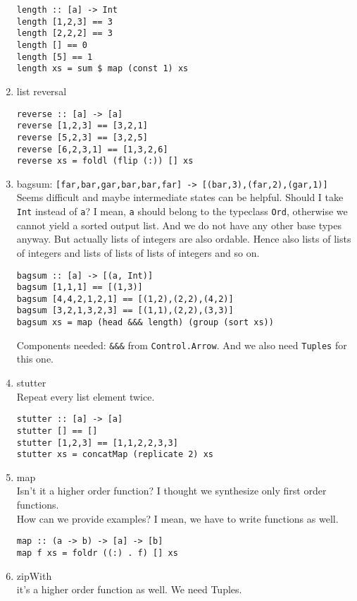 \begin{enumerate}
\begin{lstlisting}
length :: [a] -> Int
length [1,2,3] == 3
length [2,2,2] == 3
length [] == 0
length [5] == 1
length xs = sum $ map (const 1) xs
	\end{lstlisting}
%
	\item list reversal
	\begin{lstlisting}
reverse :: [a] -> [a]
reverse [1,2,3] == [3,2,1]
reverse [5,2,3] == [3,2,5]
reverse [6,2,3,1] == [1,3,2,6]
reverse xs = foldl (flip (:)) [] xs
	\end{lstlisting}
%
	\item bagsum: \lstinline![far,bar,gar,bar,bar,far] -> [(bar,3),(far,2),(gar,1)]!\\
	Seems difficult and maybe intermediate states can be helpful. Should I take \lstinline?Int? instead of \lstinline?a?? I mean, \lstinline?a? should belong to the typeclass \lstinline?Ord?, otherwise we cannot yield a sorted output list. And we do not have any other base types anyway. But actually lists of integers are also ordable. Hence also lists of lists of integers and lists of lists of lists of integers and so on.
	\begin{lstlisting}
bagsum :: [a] -> [(a, Int)]
bagsum [1,1,1] == [(1,3)]
bagsum [4,4,2,1,2,1] == [(1,2),(2,2),(4,2)]
bagsum [3,2,1,3,2,3] == [(1,1),(2,2),(3,3)]
bagsum xs = map (head &&& length) (group (sort xs))
	\end{lstlisting}
	Components needed: \lstinline?&&&? from \lstinline?Control.Arrow?. And we also need \lstinline?Tuples? for this one.
%
	\item stutter \\
	Repeat every list element twice.
	\begin{lstlisting}
stutter :: [a] -> [a]
stutter [] == []
stutter [1,2,3] == [1,1,2,2,3,3]
stutter xs = concatMap (replicate 2) xs
	\end{lstlisting}
%
	\item map \\
	Isn't it a higher order function? I thought we synthesize only first order functions.\\
	How can we provide examples? I mean, we have to write functions as well.\\
	\begin{lstlisting}
map :: (a -> b) -> [a] -> [b]
map f xs = foldr ((:) . f) [] xs
	\end{lstlisting}
%
	\item zipWith \\
	it's a higher order function as well. We need Tuples.\\

\end{enumerate}
